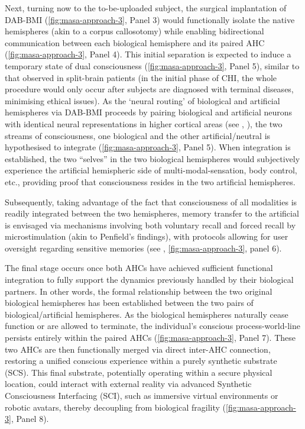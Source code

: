 \documentclass[10pt]{article}
\begin{document}
\begin{sloppypar}
  Next, turning now to the to-be-uploaded subject, the surgical implantation of DAB-BMI (\autoref{fig:masa-approach-3}, Panel 3) would functionally isolate the native hemispheres (akin to a corpus callosotomy) while enabling bidirectional communication between each biological hemisphere and its paired AHC (\autoref{fig:masa-approach-3}, Panel 4). This initial separation is expected to induce a temporary state of dual consciousness (\autoref{fig:masa-approach-3}, Panel 5), similar to that observed in split-brain patients (in the initial phase of CHI, the whole procedure would only occur after subjects are diagnosed with terminal diseases, minimising ethical issues). As the ‘neural routing’ of biological and artificial hemispheres via DAB-BMI proceeds by pairing biological and artificial neurons with identical neural representations in higher cortical areas (see \cite{watanabe_biological_2022}, \cite{watanabe2011attention}), the two streams of consciousness, one biological and the other artificial/neutral is hypothesised to integrate (\autoref{fig:masa-approach-3}, Panel 5). When integration is established, the two “selves” in the two biological hemispheres would subjectively experience the artificial hemispheric side of multi-modal-sensation, body control, etc., providing proof that consciousness resides in the two artificial hemispheres.

  Subsequently, taking advantage of the fact that consciousness of all modalities is readily integrated between the two hemispheres, memory transfer to the artificial is envisaged via mechanisms involving both voluntary recall and forced recall by microstimulation (akin to Penfield’s findings), with protocols allowing for user oversight regarding sensitive memories (see \cite{watanabe_biological_2022}, \autoref{fig:masa-approach-3}, panel 6).

  The final stage occurs once both AHCs have achieved sufficient functional integration to fully support the dynamics previously handled by their biological partners. In other words, the formal relationship between the two original biological hemispheres has been established between the two pairs of biological/artificial hemispheres. As the biological hemispheres naturally cease function or are allowed to terminate, the individual’s conscious process-world-line persists entirely within the paired AHCs (\autoref{fig:masa-approach-3}, Panel 7). These two AHCs are then functionally merged via direct inter-AHC connection, restoring a unified conscious experience within a purely synthetic substrate (SCS). This final substrate, potentially operating within a secure physical location, could interact with external reality via advanced Synthetic Consciousness Interfacing (SCI), such as immersive virtual environments or robotic avatars, thereby decoupling from biological fragility (\autoref{fig:masa-approach-3}, Panel 8).


\end{sloppypar}
\end{document}

